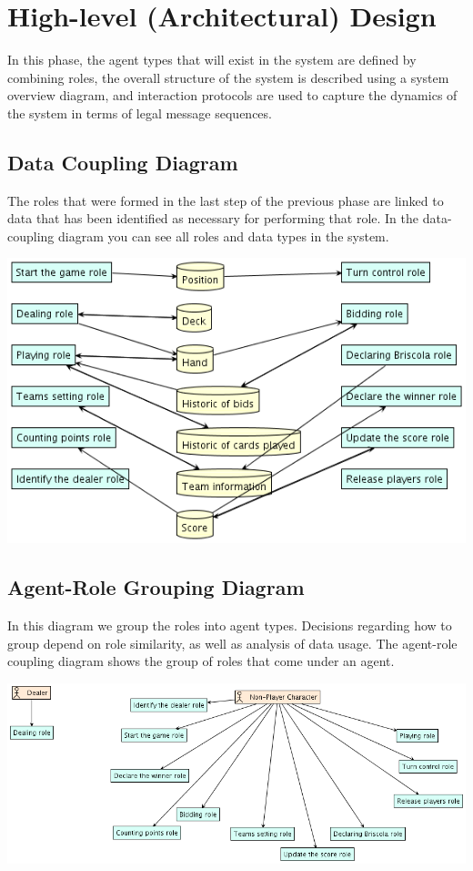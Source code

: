 \documentclass[a4paper]{article}
\begin{document}
\section{High-level (Architectural) Design}\label{sec:highdesign}

In this phase, the agent types that will exist in the system are defined by combining roles, the overall structure of the system is described using a system overview diagram, and interaction protocols are used to capture the dynamics of the system in terms of legal message sequences.

\subsection{Data Coupling Diagram}

The roles that were formed in the last step of the previous phase are linked to data that has been identified as necessary for performing that role. In the data-coupling diagram you can see all roles and data types in the system.

\includegraphics[keepaspectratio,scale=0.3]{pdt/images/architectural_design/data_coupling.png}

\subsection{Agent-Role Grouping Diagram}

In this diagram we group the roles into agent types. Decisions regarding how to group depend on role similarity, as well as analysis of data usage. The agent-role coupling diagram shows the group of roles that come under an agent.

\includegraphics[keepaspectratio,scale=0.3]{pdt/images/architectural_design/aget-role_grouping.png}
\end{document}

